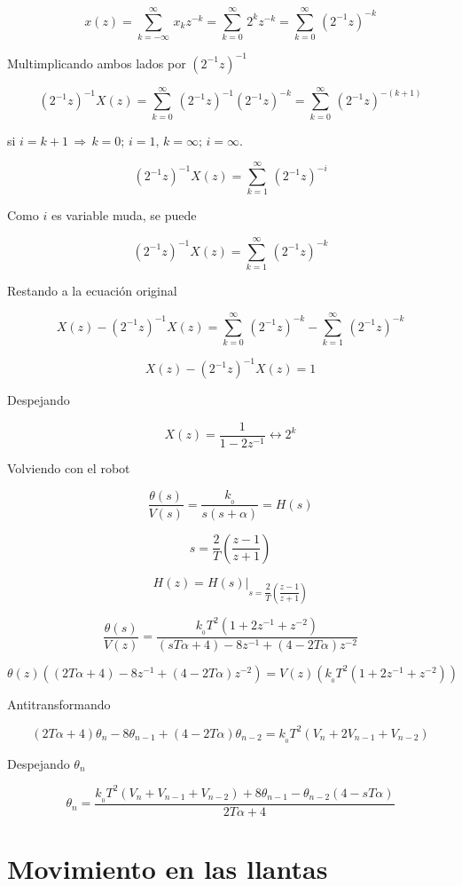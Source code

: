$$x(z) = \sum_{k = -\infty}^{\infty}\, x_{k}z^{-k} = \sum_{k = 0}^{\infty}\, 2^{k}z^{-k} = \sum_{k = 0}^{\infty}\, (2^{-1}z)^{-k}$$

Multimplicando ambos lados por $(2^{-1}z)^{-1}$

$$(2^{-1}z)^{-1} X(z) = \sum_{k = 0}^{\infty}\, (2^{-1}z)^{-1}(2^{-1}z)^{-k} = \sum_{k = 0}^{\infty}\, (2^{-1}z)^{-(k + 1)}$$

si $i = k + 1\, \Rightarrow \, k = 0;\, i = 1,\, k = \infty;\, i = \infty.$ 

$$(2^{-1}z)^{-1} X(z) = \sum_{k = 1}^{\infty}\, (2^{-1}z)^{-i}$$

Como $i$ es variable muda, se puede

$$(2^{-1}z)^{-1} X(z) = \sum_{k = 1}^{\infty}\, (2^{-1}z)^{-k}$$

Restando a la ecuación original

$$X(z) - (2^{-1}z)^{-1}X(z) = \sum_{k = 0}^{\infty}\, (2^{-1}z)^{-k} - \sum_{k = 1}^{\infty}\, (2^{-1}z)^{-k}$$

$$X(z) - (2^{-1}z)^{-1}X(z)  =  1$$

Despejando

$$X(z) = \dfrac{1}{1 - 2z^{-1}} \leftrightarrow 2^{k}$$

Volviendo con el robot

$$\dfrac{\theta(s)}{V(s)} = \dfrac{k_{_0}}{s(s + \alpha)} = H(s)$$

$$s = \dfrac{2}{T}\left( \dfrac{z - 1}{z + 1} \right)$$ 

$$H(z) = \left. H(s)\right|_{s = \dfrac{2}{T}\left( \dfrac{z - 1}{z + 1} \right)}$$

$$\dfrac{\theta(s)}{V(z)} = \dfrac{k_{_0}T^{2}(1 + 2z^{-1} + z^{-2})}{(sT\alpha + 4) - 8z^{-1} + (4 - 2T\alpha)z^{-2}}$$
	
$$\theta(z)\left( (2T\alpha + 4) - 8z^{-1} + (4 - 2T\alpha)z^{-2} \right) = V(z)\left( k_{_0}T^{2}(1 + 2z^{-1} + z^{-2}) \right)$$	

Antitransformando

$$(2T\alpha + 4)\theta_{n} - 8\theta_{n - 1} + (4 - 2T\alpha)\theta_{n - 2} = k_{_0}T^{2}(V_{n} + 2V_{n - 1} + V_{n - 2})$$ 

Despejando $\theta_{n}$

$$\theta_{n} = \dfrac{k_{_0}T^{2}(V_{n} + V_{n - 1} + V_{n - 2}) + 8\theta_{n - 1} - \theta_{n - 2}(4 - sT\alpha)}{2T\alpha + 4}$$


\section{Movimiento en las llantas}

